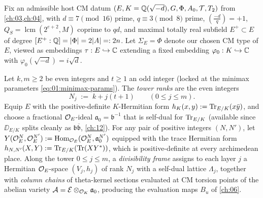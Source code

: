 Fix an admissible host CM datum $(E, K = \mathbb{Q}(\sqrt{-d}), G, \Phi, A_0, \mathcal{T}, T_2)$ from \cref{ch:03,ch:04}, with $d \equiv 7 \pmod{16}$ prime, $q \equiv 3 \pmod 8$ prime, $(\frac{-d}{q}) = +1$, $Q_S = \operatorname{lcm}(2^{e+2}, M)$ coprime to $qd$, and maximal totally real subfield $E^+ \subset E$ of degree $[E^+:\mathbb{Q}] = |\Phi| = 2|A| =: 2n$. Let $\Sigma_E = \Phi$ denote our chosen CM type of $E$, viewed as embeddings $\tau : E \hookrightarrow \mathbb{C}$ extending a fixed embedding $\varphi_0 : K \hookrightarrow \mathbb{C}$ with $\varphi_0(\sqrt{-d}) = i\sqrt{d}$.

\begin{definition}
\label{def:07:tower-ranks}
Let $k, m \ge 2$ be even integers and $t \ge 1$ an odd integer (locked at the minimax parameters \eqref{eq:01:minimax-params}). The \emph{tower ranks} are the even integers
\[
  N_j \;:=\; k + j(t + 1) \qquad (0 \le j \le m).
\]
Equip $E$ with the positive-definite $K$-Hermitian form $h_K(x, y) := \operatorname{Tr}_{E/K}(x \bar{y})$, and choose a fractional $\mathcal{O}_E$-ideal $\mathfrak{a}_0 = \mathfrak{b}^{-1}$ that is self-dual for $\operatorname{Tr}_{E/K}$ (available since $\DD_{E/K}$ splits cleanly as $\mathfrak{b}\overline{\mathfrak{b}}$, \cref{ch:12}). For any pair of positive integers $(N, N')$, let $Y(\mathcal{O}_E^N, \mathcal{O}_E^{N'}) := \mathrm{Hom}_{\mathcal{O}_E}(\mathcal{O}_E^N, \mathfrak{a}_0^{N'})$ equipped with the trace Hermitian form $h_{N, N'}(X, Y) := \operatorname{Tr}_{E/K}(\operatorname{Tr}(X Y^*))$, which is positive-definite at every archimedean place. Along the tower $0 \le j \le m$, a \emph{divisibility frame} assigns to each layer $j$ a Hermitian $\mathcal{O}_E$-space $(V_j, h_j)$ of rank $N_j$ with a self-dual lattice $\Lambda_j$, together with \emph{column chains} of theta-kernel sections evaluated at CM torsion points of the abelian variety $\mathcal{A} = \mathcal{E} \otimes_{\mathcal{O}_K} \mathfrak{a}_0$, producing the evaluation maps $B_u$ of \cref{ch:06}.
\end{definition}


